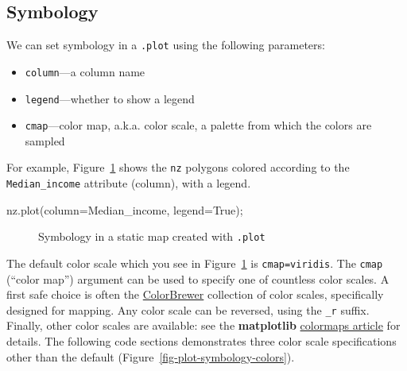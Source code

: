 \documentclass[
  letterpaper,
]{krantz}
\newenvironment{Shaded}{\begin{snugshade}}{\end{snugshade}}
\newcommand{\NormalTok}[1]{\textcolor[rgb]{0.00,0.23,0.31}{#1}}
\newcommand{\OperatorTok}[1]{\textcolor[rgb]{0.37,0.37,0.37}{#1}}
\newcommand{\StringTok}[1]{\textcolor[rgb]{0.13,0.47,0.30}{#1}}
\newcommand{\VariableTok}[1]{\textcolor[rgb]{0.07,0.07,0.07}{#1}}
\providecommand{\tightlist}{%
  \setlength{\itemsep}{0pt}\setlength{\parskip}{0pt}}\usepackage{longtable,booktabs,array}
\begin{document}
\subsection{Symbology}\label{sec-plot-symbology}

We can set symbology in a \texttt{.plot} using the following parameters:

\begin{itemize}
\tightlist
\item
  \texttt{column}---a column name
\item
  \texttt{legend}---whether to show a legend
\item
  \texttt{cmap}---color map, a.k.a. color scale, a palette from which
  the colors are sampled
\end{itemize}

For example, Figure~\ref{fig-plot-symbology} shows the \texttt{nz}
polygons colored according to the
\texttt{\textquotesingle{}Median\_income\textquotesingle{}} attribute
(column), with a legend.

\begin{Shaded}
\begin{Highlighting}[]
\NormalTok{nz.plot(column}\OperatorTok{=}\StringTok{\textquotesingle{}Median\_income\textquotesingle{}}\NormalTok{, legend}\OperatorTok{=}\VariableTok{True}\NormalTok{)}\OperatorTok{;}
\end{Highlighting}
\end{Shaded}

\begin{figure}[H]


\caption{\label{fig-plot-symbology}Symbology in a static map created
with \texttt{.plot}}

\end{figure}%

The default color scale which you see in Figure~\ref{fig-plot-symbology}
is \texttt{cmap=\textquotesingle{}viridis\textquotesingle{}}. The
\texttt{cmap} (``color map'') argument can be used to specify one of
countless color scales. A first safe choice is often the
\href{https://colorbrewer2.org/\#type=sequential&scheme=BuGn&n=3}{ColorBrewer}
collection of color scales, specifically designed for mapping. Any color
scale can be reversed, using the \texttt{\_r} suffix. Finally, other
color scales are available: see the \textbf{matplotlib}
\href{https://matplotlib.org/stable/tutorials/colors/colormaps.html}{colormaps
article} for details. The following code sections demonstrates three
color scale specifications other than the default
(Figure~\ref{fig-plot-symbology-colors}).
\end{document}
